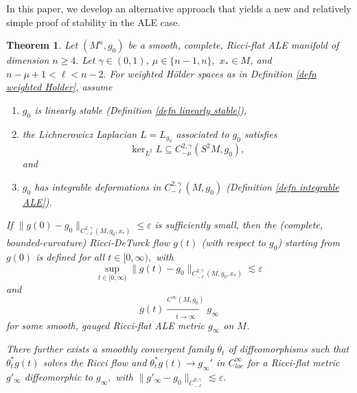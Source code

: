 \documentclass[12pt]{amsart}
\renewcommand{\1}{{\mathbf 1}}
\newcommand{\eps}{{\varepsilon}}
\newtheorem{thm}{Theorem}[section]
\theoremstyle{others}
\numberwithin{equation}{section}
\begin{document}

In this paper, we develop an alternative approach that yields a new and relatively simple proof of stability in the ALE case. %


\begin{thm} \label{main thm weighted Schauder spaces}
    Let $(M^n, g_0)$ be a smooth, complete, Ricci-flat ALE manifold of dimension $n \geq 4.$
    Let $\gamma \in (0,1)$, $\mu \in \{n-1,n\},$ $x_* \in M$, and $ n- \mu + 1 < \ell < n-2.$ %
    For weighted H{\"o}lder spaces as in Definition \ref{defn weighted Holder}, assume
    \begin{enumerate}
        \item  \label{main thm weighted Schauder spaces, hypothesis stable}
        $g_0$ is linearly stable (Definition \ref{defn linearly stable}),
        \item \label{main thm weighted Schauder spaces, hypothesis 2}
        the Lichnerowicz Laplacian $L = L_{g_0}$ associated to $g_0$ satisfies 
            $$\ker_{L^2} L \subseteq C^{2, \gamma}_{-\mu}(S^2 M, g_0),$$
        and
        \item \label{main thm weighted Schauder spaces, hypothesis integrable}
        $g_0$ has integrable deformations in $C^{2, \gamma}_{-\ell} ( M, g_0)$ (Definition \ref{defn integrable ALE}).
    \end{enumerate}
    
    If $\|g(0) - g_0 \|_{C^{2, \gamma}_{-\ell}(M, g_0, x_*)} \leq \eps$ is sufficiently small,  %
    then the (complete, bounded-curvature) Ricci-DeTurck flow $g(t)$ (with respect to $g_0$) starting from $g(0)$ is defined for all $t \in [0, \infty),$ with
    $$\sup_{t \in [0, \infty)} \|g(t) - g_0 \|_{C^{2, \gamma}_{-\ell}(M, g_0, x_*)} \lesssim \eps$$
    and 
        $$g(t) \xrightarrow[t\to \infty]{C^\infty(M, g_0)} g_\infty$$
    for some smooth, gauged Ricci-flat ALE metric $g_\infty$ on $M$.

    There further exists a smoothly convergent family $\theta_t$ of diffeomorphisms %
    such that $\theta_t^* g(t)$ solves the Ricci flow and $\theta_t^*g(t) \to g_{\infty}'$ in $C^\infty_{loc}$
    for a Ricci-flat metric $g'_\infty$ diffeomorphic to $g_\infty,$ with $\|g'_\infty - g_0 \|_{C^{0,\gamma}_{-\ell}} \lesssim \eps.$
\end{thm}
\end{document}
